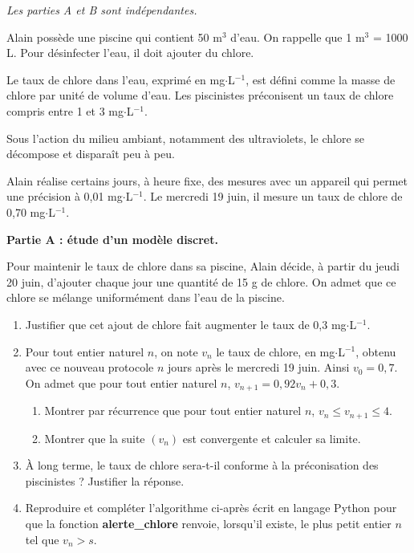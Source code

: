 \documentclass[11pt,fleqn, openany]{book} %
\begin{document}
\begin{exercise}[topic=diff03, subtitle={(Métropole 2024)}]
\textit{Les parties A et B sont indépendantes.}

Alain possède une piscine qui contient 50 m$^3$ d'eau. On rappelle que 1 m$^3$ = 1000 L. Pour désinfecter l'eau, il doit ajouter du chlore. 

Le taux de chlore dans l'eau, exprimé en mg$\cdot$L$^{-1}$, est défini comme la masse de chlore par unité de volume d'eau. Les piscinistes préconisent un taux de chlore compris entre 1 et 3 mg$\cdot$L$^{-1}$.

Sous l'action du milieu ambiant, notamment des ultraviolets, le chlore se décompose et disparaît peu à peu.

Alain réalise certains jours, à heure fixe, des mesures avec un appareil qui permet une précision à 0,01 mg$\cdot$L$^{-1}$. Le mercredi 19 juin, il mesure un taux de chlore de 0,70 mg$\cdot$L$^{-1}$.

\textbf{Partie A : étude d'un modèle discret.}

Pour maintenir le taux de chlore dans sa piscine, Alain décide, à partir du jeudi 20 juin, d'ajouter chaque jour une quantité de 15 g de chlore. On admet que ce chlore se mélange uniformément dans l'eau de la piscine.
\begin{enumerate}
\item Justifier que cet ajout de chlore fait augmenter le taux de 0,3 mg$\cdot$L$^{-1}$.
\item Pour tout entier naturel $n$, on note $v_n$ le taux de chlore, en mg$\cdot$L$^{-1}$, obtenu avec ce nouveau protocole $n$ jours après le mercredi 19 juin. Ainsi $v_0 = 0,7$.\\
On admet que pour tout entier naturel $n$, $v_{n+1} = 0,92v_n +0,3$.
\begin{enumerate}
\item Montrer par récurrence que pour tout entier naturel $n$, $v_n \leqslant v_{n+1} \leqslant 4$.
\item Montrer que la suite $(v_n)$ est convergente et calculer sa limite.\end{enumerate}
\item À long terme, le taux de chlore sera-t-il conforme à la préconisation des piscinistes ? Justifier la réponse.
\item Reproduire et compléter l'algorithme ci-après écrit en langage Python pour que
la fonction \textbf{alerte\_chlore} renvoie, lorsqu'il existe, le plus petit entier $n$ tel que $v_n > s$.


\end{enumerate}
\end{exercise}
\end{document}

